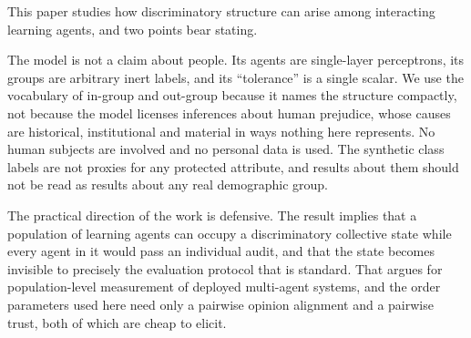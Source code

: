 This paper studies how discriminatory structure can arise among interacting
learning agents, and two points bear stating.

The model is not a claim about people. Its agents are single-layer perceptrons,
its groups are arbitrary inert labels, and its ``tolerance'' is a single scalar.
We use the vocabulary of in-group and out-group because it names the structure
compactly, not because the model licenses inferences about human prejudice, whose
causes are historical, institutional and material in ways nothing here
represents. No human subjects are involved and no personal data is used. The
synthetic class labels are not proxies for any protected attribute, and results
about them should not be read as results about any real demographic group.

The practical direction of the work is defensive. The result implies that a
population of learning agents can occupy a discriminatory collective state while
every agent in it would pass an individual audit, and that the state becomes
invisible to precisely the evaluation protocol that is standard. That argues for
population-level measurement of deployed multi-agent systems, and the order
parameters used here need only a pairwise opinion alignment and a pairwise trust,
both of which are cheap to elicit.
